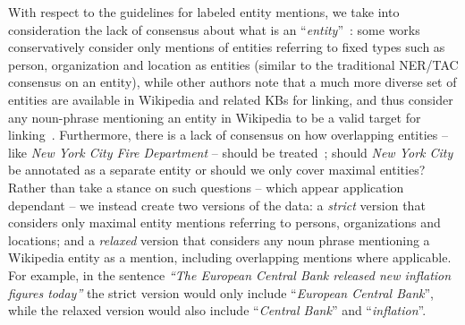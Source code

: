 \documentclass{llncs}
\begin{document}
With respect to the guidelines for labeled entity mentions, we take into consideration the lack of consensus about what is an ``\textit{entity}''~\cite{usa_Gerbil_jha2017all,LingSW15,ourAMW2018}: some works conservatively consider only mentions of entities referring to fixed types such as person, organization and location as entities (similar to the traditional NER/TAC consensus on an entity), while other authors note that a much more diverse set of entities are available in Wikipedia and related KBs for linking, and thus consider any noun-phrase mentioning an entity in Wikipedia to be a valid target for linking~\cite{PereraMAST16}. Furthermore, there is a lack of consensus on how overlapping entities -- like \textit{New York City Fire Department} -- should be treated~\cite{usa_Gerbil_jha2017all,LingSW15}; should \textit{New York City} be annotated as a separate entity or should we only cover maximal entities? Rather than take a stance on such questions -- which appear application dependant -- we instead create two versions of the data: a \textit{strict} version that considers only maximal entity mentions referring to persons, organizations and locations; and a \textit{relaxed} version that considers any noun phrase mentioning a Wikipedia entity as a mention, including overlapping mentions where applicable. For example, in the sentence \textit{``The European Central Bank released new inflation figures today''} the strict version would only include ``\textit{European Central Bank}'', while the relaxed version would also include ``\textit{Central Bank}'' and ``\textit{inflation}''.

\end{document}
